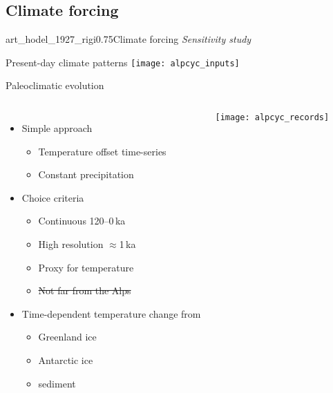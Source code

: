 \subsection{Climate forcing}

    \begin{sectionframe}{art_hodel_1927_rigi}{0.75}{Climate forcing}
      \emph{Sensitivity study}
    \end{sectionframe}

    \begin{frame}{Present-day climate patterns}
      \texttt{[image: alpcyc\_inputs]}
    \end{frame}

    \begin{frame}{Paleoclimatic evolution}
      \begin{columns}
      \column{80mm}
      \begin{itemize}
        \item Simple approach
          \begin{itemize}
            \item Temperature offset time-series
            \item Constant precipitation
          \end{itemize}
        \bigskip\pause
        \item Choice criteria
          \begin{itemize}
            \item Continuous 120--0\,ka
            \item High resolution $\approx$1\,ka
            \item Proxy for temperature
            \item \sout<3->{Not far from the Alps}
          \end{itemize}
        \bigskip\pause
        \item Time-dependent temperature change from
          \begin{itemize}
            \item {} Greenland ice 
            \item {} Antarctic ice 
            \item {} sediment 
          \end{itemize}
      \end{itemize}
      \column{40mm}
      \texttt{[image: alpcyc\_records]}
      \end{columns}
    \end{frame}

